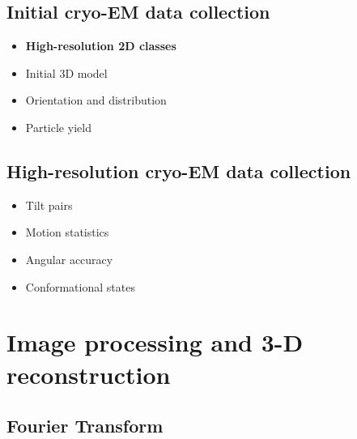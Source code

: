 \documentclass{article}
\begin{document}
    \subsection{Initial cryo-EM data collection}
    \begin{itemize}
        \item \bf High-resolution 2D classes
        \item Initial 3D model 
        \item Orientation and distribution
        \item Particle yield
    \end{itemize}
    \subsection{High-resolution cryo-EM data collection}
    \begin{itemize}
        \item Tilt pairs
        \item Motion statistics
        \item Angular accuracy
        \item Conformational states
    \end{itemize}
















    \section{Image processing and 3-D reconstruction}

    \subsection{Fourier Transform}
\end{document}
